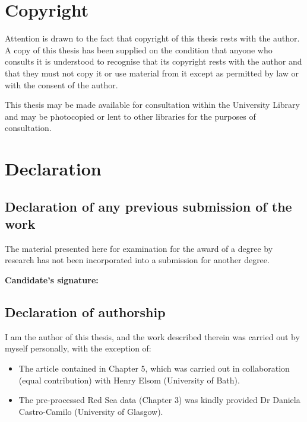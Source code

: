 \newpage


\chapter*{Copyright}

Attention is drawn to the fact that copyright of this thesis rests with the author. 
A copy of this thesis has been supplied on the condition that anyone who consults it is 
understood to recognise that its copyright rests with the author and that they must 
not copy it or use material from it except as permitted by law or with the consent of the author.

This thesis may be made available for consultation within the University Library and 
may be photocopied or lent to other libraries for the purposes of consultation. 

\newpage

\chapter*{Declaration}

\section*{Declaration of any previous submission of the work}

The material presented here for examination for the award of a degree by research 
has not been incorporated into a submission for another degree.

\vspace{2em} 

\textbf{Candidate's signature:} \dotfill

\vspace{3em}

\section*{Declaration of authorship}

I am the author of this thesis, and the work described therein was carried out by myself personally, 
with the exception of:
\begin{itemize}
\item The article contained in Chapter 5, which was carried out in collaboration (equal contribution) with Henry Elsom (University of Bath).
\item The pre-processed Red Sea data (Chapter 3) was kindly provided Dr Daniela Castro-Camilo (University of Glasgow).
\end{itemize}

